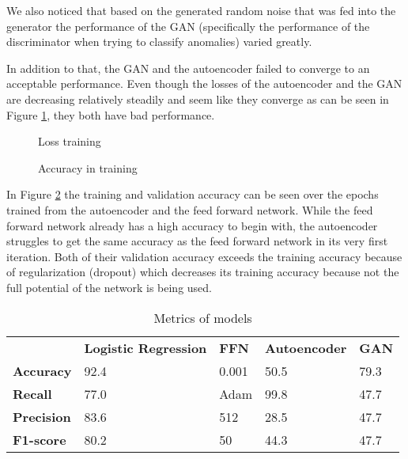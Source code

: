 \documentclass[]{article}
\begin{document}
	We also noticed that based on the generated random noise that was fed into the generator the performance of the GAN (specifically the performance of the discriminator when trying to classify anomalies) varied greatly. 
	\newline
	
	\noindent
	In addition to that, the GAN and the autoencoder failed to converge to an acceptable performance. Even though the losses of the autoencoder and the GAN are decreasing relatively steadily and seem like they converge as can be seen in Figure \ref{loss}, they both have bad performance.
	\newline
	
		\begin{figure}[!tbp]
		\centering
		\hfill
		\hfill
		\caption{Loss training}
		\label{loss}
	\end{figure}

	\begin{figure}[!tbp]
	\centering
	\hfill
	\caption{Accuracy in training}
	\label{accuracy}
	\end{figure}

	\noindent
	In Figure \ref{accuracy} the training and validation accuracy can be seen over the epochs trained from the autoencoder and the feed forward network. While the feed forward network already has a high accuracy to begin with, the autoencoder struggles to get the same accuracy as the feed forward network in its very first iteration. Both of their validation accuracy exceeds the training accuracy because of regularization (dropout) which decreases its training accuracy because not the full potential of the network is being used. 
	\newline
	
			\begin{table}[]
		\begin{tabular}{lllll}
			& \textbf{Logistic Regression} & \textbf{FFN} & \textbf{Autoencoder} & \textbf{GAN} \\
			\textbf{Accuracy}  & 92.4                       & 0.001        & 50.5             & 79.3      \\
			\textbf{Recall}    & 77.0                         & Adam         & 99.8                 & 47.7        \\
			\textbf{Precision} & 83.6                         & 512          & 28.5                  & 47.7         \\
			\textbf{F1-score}  & 80.2                         & 50           & 44.3                   & 47.7        
		\end{tabular}
		\caption{Metrics of models}
		\label{table1}
	\end{table}
\end{document}
